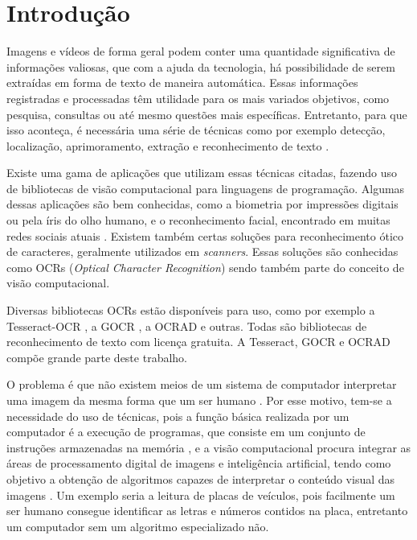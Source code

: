 \chapter{Introdução}

Imagens e vídeos de forma geral podem conter uma quantidade significativa de informações valiosas, que com a ajuda da tecnologia, há possibilidade de serem extraídas em forma de texto de maneira automática. Essas informações registradas e processadas têm utilidade para os mais variados objetivos, como pesquisa, consultas ou até mesmo questões mais específicas. Entretanto, para que isso aconteça, é necessária uma série de técnicas como por exemplo detecção, localização, aprimoramento, extração e reconhecimento de texto \cite{jung2004text}.

Existe uma gama de aplicações que utilizam essas técnicas citadas, fazendo uso de bibliotecas de visão computacional para linguagens de programação. Algumas dessas aplicações são bem conhecidas, como a biometria por impressões digitais ou pela íris do olho humano, e o reconhecimento facial, encontrado em muitas redes sociais atuais \cite{caap}. Existem também certas soluções para reconhecimento ótico de caracteres, geralmente utilizados em \textit{scanners}. Essas soluções são conhecidas como OCRs (\textit{Optical Character Recognition}) sendo também parte do conceito de visão computacional. 

Diversas bibliotecas OCRs estão disponíveis para uso, como por exemplo a Tesseract-OCR \cite{tesseract-ocr}, a GOCR \cite{GOCR}, a OCRAD \cite{OCRAD} e outras. Todas são bibliotecas de reconhecimento de texto com licença gratuita. A Tesseract, GOCR e OCRAD compõe grande parte deste trabalho. 

O problema é que não existem meios de um sistema de computador interpretar uma imagem da mesma forma que um ser humano \cite{rudek}. Por esse motivo, tem-se a necessidade do uso de técnicas, pois a função básica realizada por um computador é a execução de programas, que consiste em um conjunto de instruções armazenadas na memória \cite{stallings}, e a visão computacional procura integrar as áreas de processamento digital de imagens e inteligência artificial, tendo como objetivo a obtenção de algoritmos capazes de interpretar o conteúdo visual das imagens \cite{avancosvisao}. Um exemplo seria a leitura de placas de veículos, pois facilmente um ser humano consegue identificar as letras e números contidos na placa, entretanto um computador sem um algoritmo especializado não.

